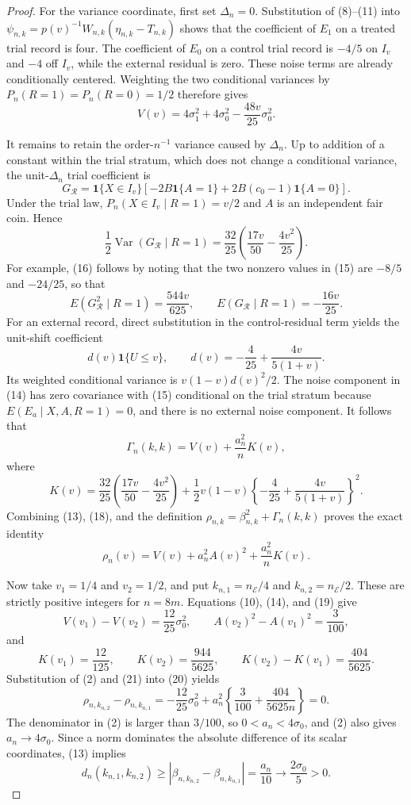 \documentclass{article}
\begin{document}
\begin{proof}
For the variance coordinate, first set \(\Delta_n=0\).  Substitution of (8)--(11) into \(\psi_{n,k}=p(v)^{-1}W_{n,k}(\eta_{n,k}-T_{n,k})\) shows that the coefficient of \(E_1\) on a treated trial record is four.  The coefficient of \(E_0\) on a control trial record is \(-4/5\) on \(I_v\) and \(-4\) off \(I_v\), while the external residual is zero.  These noise terms are already conditionally centered.  Weighting the two conditional variances by \(P_n(R=1)=P_n(R=0)=1/2\) therefore gives
\[
 V(v)=4\sigma_1^2+4\sigma_0^2-\frac{48v}{25}\sigma_0^2.
 \tag{14}
\]

It remains to retain the order-\(n^{-1}\) variance caused by \(\Delta_n\).  Up to addition of a constant within the trial stratum, which does not change a conditional variance, the unit-\(\Delta_n\) trial coefficient is
\[
 G_{\mathcal R}
 =\mathbf 1\{X\in I_v\}
 \left[-2B\mathbf 1\{A=1\}
 +2B(c_0-1)\mathbf 1\{A=0\}\right].
 \tag{15}
\]
Under the trial law, \(P_n(X\in I_v\mid R=1)=v/2\) and \(A\) is an independent fair coin.  Hence
\[
 \frac12\operatorname{Var}(G_{\mathcal R}\mid R=1)
 =\frac{32}{25}\left(\frac{17v}{50}-\frac{4v^2}{25}\right).
 \tag{16}
\]
For example, (16) follows by noting that the two nonzero values in (15) are \(-8/5\) and \(-24/25\), so that
\[
 E(G_{\mathcal R}^2\mid R=1)=\frac{544v}{625},
 \qquad
 E(G_{\mathcal R}\mid R=1)=-\frac{16v}{25}.
\]
For an external record, direct substitution in the control-residual term yields the unit-shift coefficient
\[
 d(v)\mathbf 1\{U\leq v\},
 \qquad
 d(v)=-\frac4{25}+\frac{4v}{5(1+v)}.
 \tag{17}
\]
Its weighted conditional variance is \(v(1-v)d(v)^2/2\).  The noise component in (14) has zero covariance with (15) conditional on the trial stratum because \(E(E_a\mid X,A,R=1)=0\), and there is no external noise component.  It follows that
\[
 \Gamma_n(k,k)=V(v)+\frac{a_n^2}{n}K(v),
 \tag{18}
\]
where
\[
 K(v)=
 \frac{32}{25}\left(\frac{17v}{50}-\frac{4v^2}{25}\right)
 +\frac12v(1-v)
 \left\{-\frac4{25}+\frac{4v}{5(1+v)}\right\}^{2}.
 \tag{19}
\]
Combining (13), (18), and the definition \(\rho_{n,k}=\beta_{n,k}^2+\Gamma_n(k,k)\) proves the exact identity
\[
 \rho_n(v)=V(v)+a_n^2A(v)^2+\frac{a_n^2}{n}K(v).
 \tag{20}
\]

Now take \(v_1=1/4\) and \(v_2=1/2\), and put \(k_{n,1}=n_{\mathcal E}/4\) and \(k_{n,2}=n_{\mathcal E}/2\).  These are strictly positive integers for \(n=8m\).  Equations (10), (14), and (19) give
\[
 V(v_1)-V(v_2)=\frac{12}{25}\sigma_0^2,
 \qquad
 A(v_2)^2-A(v_1)^2=\frac3{100},
\]
and
\[
 K(v_1)=\frac{12}{125},
 \qquad
 K(v_2)=\frac{944}{5625},
 \qquad
 K(v_2)-K(v_1)=\frac{404}{5625}.
 \tag{21}
\]
Substitution of (2) and (21) into (20) yields
\[
 \rho_{n,k_{n,2}}-\rho_{n,k_{n,1}}
 =-\frac{12}{25}\sigma_0^2
 +a_n^2\left\{\frac3{100}+\frac{404}{5625n}\right\}=0.
 \tag{22}
\]
The denominator in (2) is larger than \(3/100\), so \(0<a_n<4\sigma_0\), and (2) also gives \(a_n\to4\sigma_0\).  Since a norm dominates the absolute difference of its scalar coordinates, (13) implies
\[
 d_n(k_{n,1},k_{n,2})
 \geq |\beta_{n,k_{n,2}}-\beta_{n,k_{n,1}}|
 =\frac{a_n}{10}
 \longrightarrow\frac{2\sigma_0}{5}>0.
 \tag{23}
\]


\end{proof}
\end{document}
